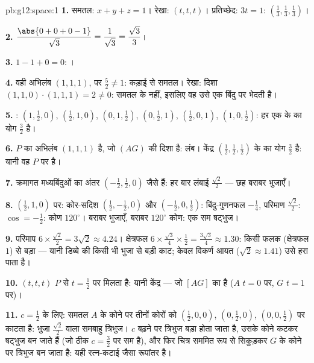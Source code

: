 \begin{solution}{pb:g12:space:1}
\textbf{1.} समतल: $x + y + z = 1$। रेखा: $(t, t, t)$। प्रतिच्छेद: $3t = 1$: $\left(\frac13, \frac13, \frac13\right)$।

\textbf{2.} $\dfrac{\abs{0 + 0 + 0 - 1}}{\sqrt3} =
\dfrac{1}{\sqrt3} = \dfrac{\sqrt3}{3}$।

\textbf{3.} $1 - 1 + 0 = 0$: ।

\textbf{4.} वही अभिलंब $(1,1,1)$, पर $\frac52 \neq 1$: कड़ाई से  समतल। रेखा: दिशा
$(1,1,0) \cdot (1,1,1) = 2 \neq 0$: समतल के  नहीं, इसलिए वह उसे एक बिंदु पर भेदती है।

\textbf{5.} : $\left(1, \frac12, 0\right)$, $\left(\frac12, 1, 0\right)$, $\left(0, 1, \frac12\right)$, $\left(0, \frac12, 1\right)$, $\left(\frac12, 0, 1\right)$, $\left(1, 0, \frac12\right)$: हर एक के
 का योग $\frac32$ है।

\textbf{6.} $P$ का अभिलंब $(1,1,1)$ है, जो $(AG)$ की दिशा है: लंब। केंद्र $\left(\frac12,\frac12,\frac12\right)$
के  का योग $\frac32$ है: यानी वह $P$ पर है।

\textbf{7.} क्रमागत मध्यबिंदुओं का अंतर $\left(-\frac12, \frac12, 0\right)$ जैसे  हैं: हर बार लंबाई
$\frac{\sqrt2}{2}$ --- छह बराबर भुजाएँ।

\textbf{8.} $\left(\frac12, 1, 0\right)$ पर: कोर-सदिश $\left(\frac12, -\frac12, 0\right)$ और $\left(-\frac12, 0, \frac12\right)$: बिंदु-गुणनफल $-\frac14$, परिमाण
$\frac{\sqrt2}{2}$: $\cos = -\frac12$: कोण $120^\circ$। बराबर भुजाएँ, बराबर $120^\circ$ कोण: एक सम षट्भुज।

\textbf{9.} परिमाप $6 \times \frac{\sqrt2}{2} = 3\sqrt2
\approx 4.24$। क्षेत्रफल $6 \times \frac{\sqrt3}{4} \times
\frac12 = \frac{3\sqrt3}{4} \approx 1.30$: किसी फलक (क्षेत्रफल $1$) से बड़ा
--- यानी डिब्बे की किसी भी भुजा से बड़ी काट; केवल विकर्ण आयत ($\sqrt2 \approx 1.41$) उसे हरा
पाता है।

\textbf{10.} $(t,t,t)$ $P$ से $t = \frac12$ पर मिलता है: यानी केंद्र --- जो $[AG]$ का
 है ($A$ $t = 0$ पर, $G$ $t = 1$ पर)।

\textbf{11.} $c = \frac12$ के लिए: समतल $A$ के कोने पर तीनों कोरों को $\left(\frac12,0,0\right)$, $\left(0,\frac12,0\right)$,
$\left(0,0,\frac12\right)$ पर काटता है: भुजा $\frac{\sqrt2}{2}$ वाला समबाहु त्रिभुज। $c$ बढ़ने पर त्रिभुज
बड़ा होता जाता है, उसके कोने कटकर षट्भुज बन जाते हैं (जो ठीक $c = \frac32$ पर सम है),
और फिर चित्र सममित रूप से सिकुड़कर $G$ के कोने पर त्रिभुज बन जाता है: यही
रत्न-कटाई जैसा रूपांतर है।


\end{solution}
